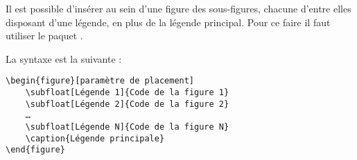Il est possible d'insérer au sein d'une figure des sous-figures, chacune d'entre elles disposant d'une légende, en plus de la légende principal.
Pour ce faire il faut utiliser le paquet .

La syntaxe est la suivante :  
\begin{verbatim}
\begin{figure}[paramètre de placement]
	\subfloat[Légende 1]{Code de la figure 1}
	\subfloat[Légende 2]{Code de la figure 2}
	…
	\subfloat[Légende N]{Code de la figure N}
	\caption{Légende principale}
\end{figure} 
\end{verbatim}


	